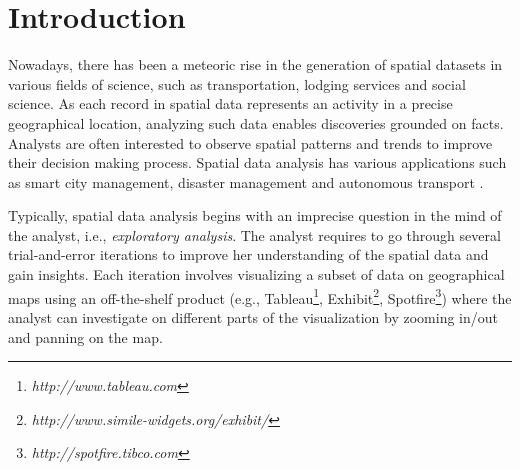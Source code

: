 \documentclass[sigconf,edbt]{acmart-edbt2019}
\begin{document}
%
% 




\maketitle

\section{Introduction}
Nowadays, there has been a meteoric rise in the generation of spatial datasets in various fields of science, such as transportation, lodging services and social science. As each record in spatial data represents an activity in a precise geographical location, analyzing such data enables discoveries grounded on facts. Analysts are often interested to observe spatial patterns and trends to improve their decision making process. Spatial data analysis has various applications such as smart city management, disaster management and autonomous transport \cite{RoddickEHPS04,Telang:2012}.

\vspace{2pt}
Typically, spatial data analysis begins with an imprecise question in the mind of the analyst, i.e., {\em exploratory analysis}. The analyst requires to go through several trial-and-error iterations to improve her understanding of the spatial data and gain insights. Each iteration involves visualizing a subset of data on geographical maps using an  off-the-shelf product (e.g., Tableau\footnote{\it http://www.tableau.com}, Exhibit\footnote{\it http://www.simile-widgets.org/exhibit/}, Spotfire\footnote{\it http://spotfire.tibco.com}) where the analyst can investigate on different parts of the visualization by zooming in/out and panning on the map. 
\end{document}
